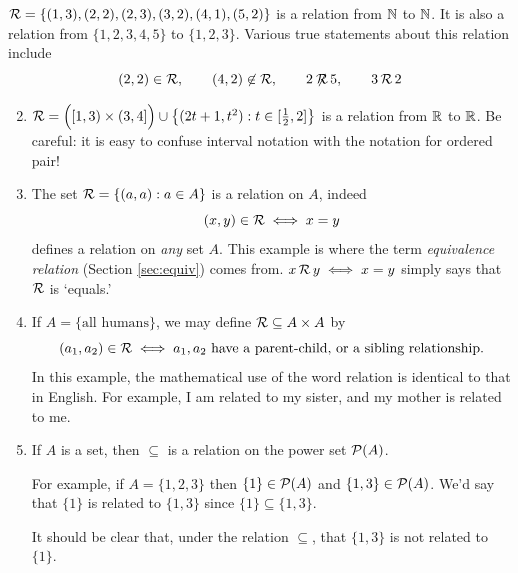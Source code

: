 \begin{examples}{}{}
	\exstart $\mathcal{R}=\{(1,3),(2,2),(2,3),(3,2),(4,1),(5,2)\}$ is a relation from $\mathbb{N}$ to $\mathbb{N}$. It is also a relation from $\{1,2,3,4,5\}$ to $\{1,2,3\}$. Various true statements about this relation include
	\[
		(2,2)\in\mathcal{R},\qquad (4,2)\not\in\mathcal{R},\qquad 2\not\!\!\mathcal{R}\,5,\qquad 3\,\mathcal{R}\,2
	\]
	\begin{enumerate}\setcounter{enumi}{1}
		\item $\mathcal{R}=\Bigl([1,3)\times (3,4]\Bigr)\cup\big\{(2t+1,t^2):t\in [\frac 12,2]\big\}$ is a relation from $\mathbb{R}$ to $\mathbb{R}$. Be careful: it is easy to confuse interval notation with the notation for ordered pair!
		\item The set $\mathcal{R}=\{(a,a):a\in A\}$ is a relation on $A$, indeed
		\[
			(x,y)\in \mathcal{R}\iff x=y
		\]
		defines a relation on \emph{any} set $A$. This example is where the term \emph{equivalence relation} (Section \ref{sec:equiv}) comes from. $x\,\mathcal{R}\,y\iff x=y$ simply says that $\mathcal{R}$ is `equals.'
		\item If $A=\{\text{all humans}\}$, we may define $\mathcal{R}\subseteq A\times A$ by
		\[
			(a_1,a_2)\in \mathcal{R}\iff a_1,a_2\text{ have a parent-child, or a sibling relationship.}
		\]
		In this example, the mathematical use of the word relation is identical to that in English. For example, I am related to my sister, and my mother is related to me.
		\item If $A$ is a set, then $\subseteq$ is a relation on the power set $\mathcal{P}(A)$.\par
		For example, if $A=\{1,2,3\}$ then $\{1\}\in\mathcal{P}(A)$ and $\{1,3\}\in\mathcal{P}(A)$. We'd say that $\{1\}$ is related to $\{1,3\}$ since $\{1\}\subseteq\{1,3\}$.\par
		It should be clear that, under the relation $\subseteq$, that $\{1,3\}$ is not related to $\{1\}$.
	\end{enumerate}
\end{examples}

